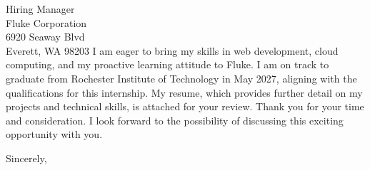 \documentclass[letterpaper,11pt]{letter} %
\begin{document}
\begin{letter}{
    Hiring Manager \\ %
    Fluke Corporation \\
    6920 Seaway Blvd \\
    Everett, WA 98203
}
I am eager to bring my skills in web development, cloud computing, and my proactive learning attitude to Fluke. I am on track to graduate from Rochester Institute of Technology in May 2027, aligning with the qualifications for this internship. My resume, which provides further detail on my projects and technical skills, is attached for your review. Thank you for your time and consideration. I look forward to the possibility of discussing this exciting opportunity with you.

\closing{Sincerely,}


\end{letter}
\end{document}
